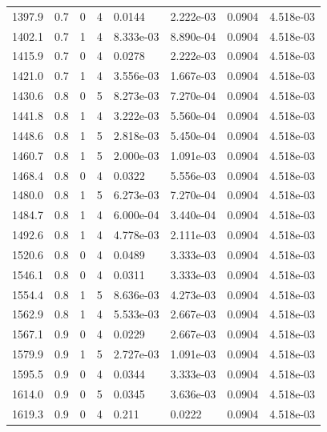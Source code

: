 \documentclass[preview]{standalone}
\begin{document}
{{{{{{\begin{tabular}{L{1.2cm}C{1.2cm} C{0.3cm}C{0.5cm} C{1.4cm}C{1.4cm} C{1.4cm}C{1.4cm}}
  1397.9  &   0.7  & 0     &  4 &  0.0144  & 2.222e-03  & 0.0904 &  4.518e-03   \\ 
  1402.1  &   0.7  & 1     &  4 &  8.333e-03  & 8.890e-04  & 0.0904 &  4.518e-03   \\ 
  1415.9  &   0.7  & 0     &  4 &  0.0278  & 2.222e-03  & 0.0904 &  4.518e-03   \\ 
  1421.0  &   0.7  & 1     &  4 &  3.556e-03  & 1.667e-03  & 0.0904 &  4.518e-03   \\ 
  1430.6  &   0.8  & 0     &  5 &  8.273e-03  & 7.270e-04  & 0.0904 &  4.518e-03   \\ 
  1441.8  &   0.8  & 1     &  4 &  3.222e-03  & 5.560e-04  & 0.0904 &  4.518e-03   \\ 
  1448.6  &   0.8  & 1     &  5 &  2.818e-03  & 5.450e-04  & 0.0904 &  4.518e-03   \\ 
  1460.7  &   0.8  & 1     &  5 &  2.000e-03  & 1.091e-03  & 0.0904 &  4.518e-03   \\ 
  1468.4  &   0.8  & 0     &  4 &  0.0322  & 5.556e-03  & 0.0904 &  4.518e-03   \\ 
  1480.0  &   0.8  & 1     &  5 &  6.273e-03  & 7.270e-04  & 0.0904 &  4.518e-03   \\ 
  1484.7  &   0.8  & 1     &  4 &  6.000e-04  & 3.440e-04  & 0.0904 &  4.518e-03   \\ 
  1492.6  &   0.8  & 1     &  4 &  4.778e-03  & 2.111e-03  & 0.0904 &  4.518e-03   \\ 
  1520.6  &   0.8  & 0     &  4 &  0.0489  & 3.333e-03  & 0.0904 &  4.518e-03   \\ 
  1546.1  &   0.8  & 0     &  4 &  0.0311  & 3.333e-03  & 0.0904 &  4.518e-03   \\ 
  1554.4  &   0.8  & 1     &  5 &  8.636e-03  & 4.273e-03  & 0.0904 &  4.518e-03   \\ 
  1562.9  &   0.8  & 1     &  4 &  5.533e-03  & 2.667e-03  & 0.0904 &  4.518e-03   \\ 
  1567.1  &   0.9  & 0     &  4 &  0.0229  & 2.667e-03  & 0.0904 &  4.518e-03   \\ 
  1579.9  &   0.9  & 1     &  5 &  2.727e-03  & 1.091e-03  & 0.0904 &  4.518e-03   \\ 
  1595.5  &   0.9  & 0     &  4 &  0.0344  & 3.333e-03  & 0.0904 &  4.518e-03   \\ 
  1614.0  &   0.9  & 0     &  5 &  0.0345  & 3.636e-03  & 0.0904 &  4.518e-03   \\ 
  1619.3  &   0.9  & 0     &  4 &  0.211  & 0.0222  & 0.0904 &  4.518e-03   \\ 

\end{tabular}}}}}}}
\end{document}
